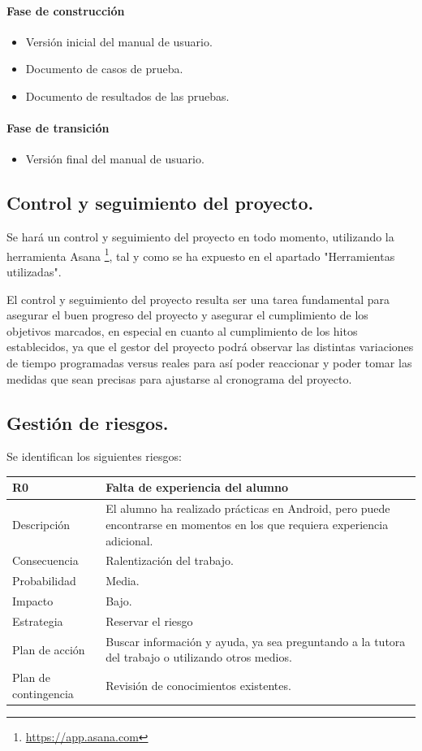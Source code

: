\documentclass[twoside]{report}
\newcommand\addrow[2]{#1 &#2\\ }
\newcommand\addheading[2]{#1 &#2\\ \hline}
\newcommand\tabularhead{\begin{tabular}{lp{0.7\textwidth}}
\hline
}
\newenvironment{risk}{\tabularhead}
{\hline\end{tabular}}
\begin{document}
\paragraph{Fase de construcción\\}
\begin{itemize}
\item Versión inicial del manual de usuario.
\item Documento de casos de prueba.
\item Documento de resultados de las pruebas.
\end{itemize}

\paragraph{Fase de transición\\}
\begin{itemize}
\item Versión final del manual de usuario.
\end{itemize}

\subsection{Control y seguimiento del proyecto.}

Se hará un control y seguimiento del proyecto en todo momento, utilizando la herramienta Asana \footnote{\url{https://app.asana.com}}, tal y como se ha expuesto en el apartado "Herramientas utilizadas".

El control y seguimiento del proyecto resulta ser una tarea fundamental para asegurar el buen progreso del proyecto y asegurar el cumplimiento de los objetivos marcados, en especial en cuanto al cumplimiento de los hitos establecidos, ya que el gestor del proyecto podrá observar las distintas variaciones de tiempo programadas versus reales para así poder reaccionar y poder tomar las medidas que sean precisas para ajustarse al cronograma del proyecto.

\subsection{Gestión de riesgos.}

Se identifican los siguientes riesgos:

\begin{risk}
  \addheading{R0}{Falta de experiencia del alumno}
  \addrow{Descripción}{El alumno ha realizado prácticas en Android, pero puede encontrarse en momentos en los que requiera experiencia adicional.}
  \addrow{Consecuencia}{Ralentización del trabajo.}
  \addrow{Probabilidad}{Media.}
  \addrow{Impacto}{Bajo.}
  \addrow{Estrategia}{Reservar el riesgo}
  \addrow{Plan de acción}{Buscar información y ayuda, ya sea preguntando a la tutora del trabajo o utilizando otros medios.}
  \addrow{Plan de contingencia}{Revisión de conocimientos existentes.}
\end{risk}
\end{document}

